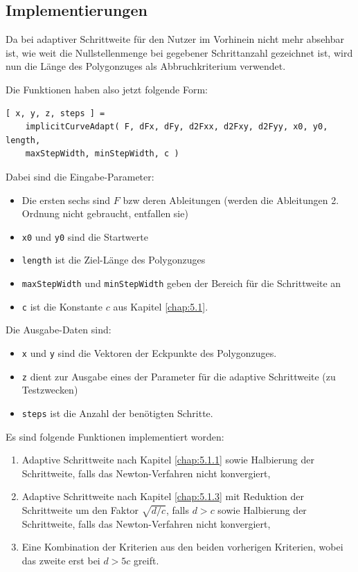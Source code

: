 \documentclass[a4paper,11pt,bibliography=totoc,listof=totoc,headinclude=true,cleardoublepage=empty,oneside]{scrartcl}
\begin{document}
\subsection{Implementierungen}\label{kap:5.2}
Da bei adaptiver Schrittweite für den Nutzer im Vorhinein nicht mehr absehbar ist, wie weit die Nullstellenmenge bei gegebener Schrittanzahl gezeichnet ist, wird nun die Länge des Polygonzuges als Abbruchkriterium verwendet.

Die Funktionen haben also jetzt folgende Form:
\begin{verbatim}
[ x, y, z, steps ] = 
    implicitCurveAdapt( F, dFx, dFy, d2Fxx, d2Fxy, d2Fyy, x0, y0, length,
    maxStepWidth, minStepWidth, c )
\end{verbatim}
Dabei sind die Eingabe-Parameter:
\begin{itemize}
	\item Die ersten sechs sind $F$ bzw deren Ableitungen (werden die Ableitungen 2. Ordnung nicht gebraucht, entfallen sie)
	\item \verb|x0| und \verb|y0| sind die Startwerte
	\item \verb|length| ist die Ziel-Länge des Polygonzuges
	\item \verb|maxStepWidth| und \verb|minStepWidth| geben der Bereich für die Schrittweite an
	\item \verb|c| ist die Konstante $c$ aus Kapitel \ref{chap:5.1}.
\end{itemize}

Die Ausgabe-Daten sind:
\begin{itemize}
	\item \verb|x| und \verb|y| sind die Vektoren der Eckpunkte des Polygonzuges.
	\item \verb|z| dient zur Ausgabe eines der Parameter für die adaptive Schrittweite (zu Testzwecken)
	\item \verb|steps| ist die Anzahl der benötigten Schritte.
\end{itemize}

Es sind folgende Funktionen implementiert worden:
\begin{enumerate}
	\item Adaptive Schrittweite nach Kapitel \ref{chap:5.1.1} sowie Halbierung der Schrittweite, falls das Newton-Verfahren nicht konvergiert,
	\item Adaptive Schrittweite nach Kapitel \ref{chap:5.1.3} mit Reduktion der Schrittweite um den Faktor $\sqrt{d/c}$, falls $d>c$ sowie Halbierung der Schrittweite, falls das Newton-Verfahren nicht konvergiert,
	\item Eine Kombination der Kriterien aus den beiden vorherigen Kriterien, wobei das zweite erst bei $d>5c$ greift.
\end{enumerate}
\end{document}
